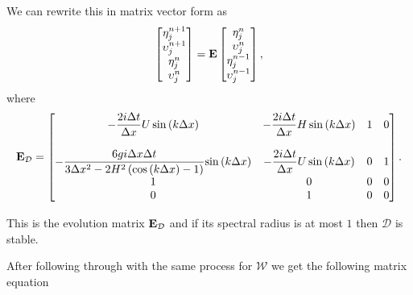 We can rewrite this in matrix vector form as
\begin{equation}
\begin{bmatrix}
\eta^{n+1}_j \\
\upsilon^{n+1}_j\\
\eta^{n}_j \\
\upsilon^{n}_j
\end{bmatrix} = \mathbf{E}
\begin{bmatrix}
\eta^{n}_j \\
\upsilon^{n}_j\\
\eta^{n-1}_j \\
\upsilon^{n-1}_j
\end{bmatrix},
\end{equation}
where 
\begin{equation*}
\mathbf{E}_{\mathcal{D}} = \begin{bmatrix}
-  \dfrac{2 i\Delta t }{\Delta x} U\sin\left(k \Delta x\right)  & -  \dfrac{2 i\Delta t}{\Delta x} H \sin\left(k \Delta x\right)  & 1 &0 \\ \\
-\dfrac{6 gi \Delta x\Delta t}{3 \Delta x^2 -2{H^2} \left( \cos\left(k \Delta x\right) - 1 \right)}{ \sin\left(k \Delta x\right)}  & -\dfrac{2i \Delta t }{\Delta x} U \sin\left(k \Delta x\right)  & 0 &1 \\
1  & 0  &0 &0 \\
0  & 1  &0 &0 
\end{bmatrix} .
\end{equation*}

This is the evolution matrix $\mathbf{E}_{\mathcal{D}}$ and if its spectral radius is at most $1$ then $\mathcal{D}$ is stable.

After following through with the same process for $\mathcal{W}$ we get the following matrix equation

